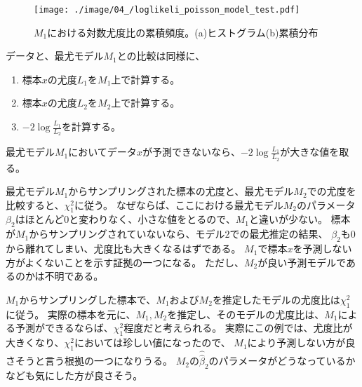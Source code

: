 \begin{figure}
    \begin{center}
        \texttt{[image: ./image/04\_/loglikeli\_poisson\_model\_test.pdf]}
        \caption{$M_1$における対数尤度比の累積頻度。(a)ヒストグラム(b)累積分布}
        \label{fig:loglikelihood_test_simulation_poisson}
    \end{center}
\end{figure}


データと、最尤モデル$M_1$との比較は同様に、
\begin{enumerate}
    \item 標本$x$の尤度$L_1$を$M_1$上で計算する。
    \item 標本$x$の尤度$L_2$を$M_2$上で計算する。
    \item $-2\log\frac{L_1}{L_2}$を計算する。
\end{enumerate}
最尤モデル$M_1$においてデータ$x$が予測できないなら、$-2\log\frac{L_1}{L_2}$が大きな値を取る。

最尤モデル$M_1$からサンプリングされた標本の尤度と、最尤モデル$M_2$での尤度を比較すると、$\chi^2_1$に従う。
なぜならば、ここにおける最尤モデル$M_2$のパラメータ$\beta_2$はほとんど0と変わりなく、小さな値をとるので、$M_1$と違いが少ない。
標本が$M_1$からサンプリングされていないなら、モデル$2$での最尤推定の結果、
$\beta_2$も$0$から離れてしまい、尤度比も大きくなるはずである。
$M_1$で標本$x$を予測しない方がよくないことを示す証拠の一つになる。
ただし、$M_2$が良い予測モデルであるのかは不明である。


$M_1$からサンプリングした標本で、$M_1$および$M_2$を推定したモデルの尤度比は$\chi^2_1$に従う。
実際の標本を元に、$M_1,M_2$を推定し、そのモデルの尤度比は、$M_1$による予測ができるならば、$\chi^2_1$程度だと考えられる。
実際にこの例では、尤度比が大きくなり、$\chi^2_1$においては珍しい値になったので、
$M_1$により予測しない方が良さそうと言う根拠の一つになりうる。
$M_2$の$\hat\hat\beta_2$のパラメータがどうなっているかなども気にした方が良さそう。







